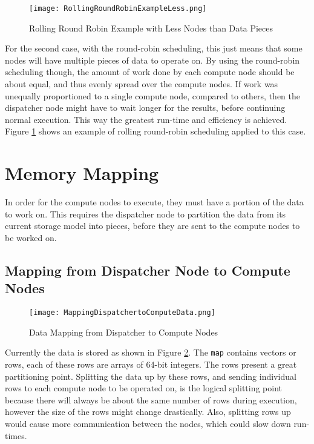 \begin{figure}[htp]
\centering
\texttt{[image: RollingRoundRobinExampleLess.png]}
\caption{Rolling Round Robin Example with Less Nodes than Data Pieces}
\label{fig:RollingRoundRobinExampleLess}
\end{figure}
For the second case, with the round-robin scheduling, this just means that some nodes will have multiple pieces of data to operate on. By using the round-robin scheduling though, the amount of work done by each compute node should be about equal, and thus evenly spread over the compute nodes. If work was unequally proportioned to a single compute node, compared to others, then the dispatcher node might have to wait longer for the results, before continuing normal execution. This way the greatest run-time and efficiency is achieved. Figure \ref{fig:RollingRoundRobinExampleLess} shows an example of rolling round-robin scheduling applied to this case.

\section{Memory Mapping} \label{sec:DistributedMemoryMapping}
In order for the compute nodes to execute, they must have a portion of the data to work on. This requires the dispatcher node to partition the data from its current storage model into pieces, before they are sent to the compute nodes to be worked on.

\subsection{Mapping from Dispatcher Node to Compute Nodes}
\begin{figure}[htp]
\centering
\texttt{[image: MappingDispatchertoComputeData.png]}
\caption{Data Mapping from Dispatcher to Compute Nodes}
\label{fig:MappingDispatcherToComputeData}
\end{figure}
Currently the data is stored as shown in Figure \ref{fig:MappingDispatcherToComputeData}. The \verb|map| contains vectors or rows, each of these rows are arrays of 64-bit integers. The rows present a great partitioning point. Splitting the data up by these rows, and sending individual rows to each compute node to be operated on, is the logical splitting point because there will always be about the same number of rows during execution, however the size of the rows might change drastically. Also, splitting rows up would cause more communication between the nodes, which could slow down run-times. 

